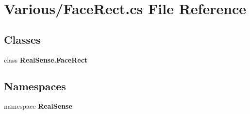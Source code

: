 \section{Various/\+Face\+Rect.cs File Reference}
\label{_face_rect_8cs}
\subsection*{Classes}
\begin{DoxyCompactItemize}
\item 
class \textbf{ Real\+Sense.\+Face\+Rect}
\end{DoxyCompactItemize}
\subsection*{Namespaces}
\begin{DoxyCompactItemize}
\item 
namespace \textbf{ Real\+Sense}
\end{DoxyCompactItemize}
